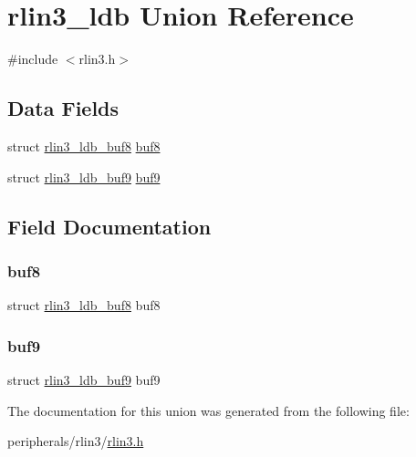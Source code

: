 \hypertarget{unionrlin3__ldb}{}\section{rlin3\+\_\+ldb Union Reference}
\label{unionrlin3__ldb}


{\ttfamily \#include $<$rlin3.\+h$>$}

\subsection*{Data Fields}
\begin{DoxyCompactItemize}
\item 
struct \mbox{\hyperlink{structrlin3__ldb__buf8}{rlin3\+\_\+ldb\+\_\+buf8}} \mbox{\hyperlink{unionrlin3__ldb_a800acc2adb34deceb65d8791cb7067e1}{buf8}}
\item 
struct \mbox{\hyperlink{structrlin3__ldb__buf9}{rlin3\+\_\+ldb\+\_\+buf9}} \mbox{\hyperlink{unionrlin3__ldb_a578a2f0a879a373d5ba4877ce98f8c3b}{buf9}}
\end{DoxyCompactItemize}


\subsection{Field Documentation}
\mbox{\label{unionrlin3__ldb_a800acc2adb34deceb65d8791cb7067e1}} 
\subsubsection{\texorpdfstring{buf8}{buf8}}
{\footnotesize\ttfamily struct \mbox{\hyperlink{structrlin3__ldb__buf8}{rlin3\+\_\+ldb\+\_\+buf8}} buf8}

\mbox{\label{unionrlin3__ldb_a578a2f0a879a373d5ba4877ce98f8c3b}} 
\subsubsection{\texorpdfstring{buf9}{buf9}}
{\footnotesize\ttfamily struct \mbox{\hyperlink{structrlin3__ldb__buf9}{rlin3\+\_\+ldb\+\_\+buf9}} buf9}



The documentation for this union was generated from the following file\+:\begin{DoxyCompactItemize}
\item 
peripherals/rlin3/\mbox{\hyperlink{rlin3_8h}{rlin3.\+h}}\end{DoxyCompactItemize}
